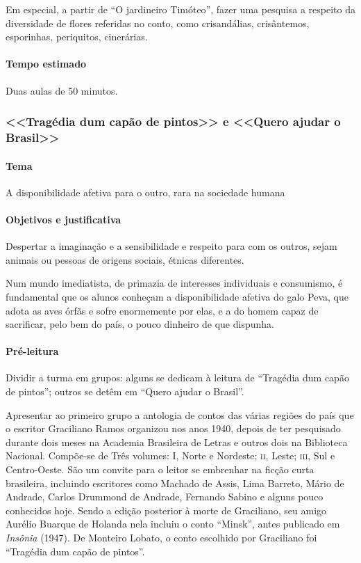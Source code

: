 \documentclass[11pt]{extarticle}
\begin{document}
Em especial, a partir de ``O jardineiro Timóteo'', fazer uma pesquisa a
respeito da diversidade de flores referidas no conto, como crisandálias,
crisântemos, esporinhas, periquitos, cinerárias.

\paragraph{Tempo estimado} Duas aulas de 50 minutos.

\subsubsection{<<Tragédia dum capão de pintos>> e <<Quero ajudar o Brasil>>}

\paragraph{Tema} A disponibilidade afetiva para o outro, rara na sociedade humana

\paragraph{Objetivos e justificativa}
Despertar a imaginação e a sensibilidade e respeito para com os outros,
sejam animais ou pessoas de origens sociais, étnicas diferentes.

Num mundo imediatista, de primazia de interesses individuais e
consumismo, é fundamental que os alunos conheçam a disponibilidade
afetiva do galo Peva, que adota as aves órfãs e sofre enormemente por
elas, e a do homem capaz de sacrificar, pelo bem do país, o pouco
dinheiro de que dispunha.

\asterisc\paragraph{Pré-leitura}

Dividir a turma em grupos: alguns se dedicam à leitura de ``Tragédia dum
capão de pintos''; outros se detêm em ``Quero ajudar o Brasil''.

Apresentar ao primeiro grupo a antologia de contos das várias regiões do
país que o escritor Graciliano Ramos organizou nos anos 1940, depois de
ter pesquisado durante dois meses na Academia Brasileira de Letras e
outros dois na Biblioteca Nacional. Compõe-se de Três volumes: I, Norte
e Nordeste; \textsc{ii}, Leste; \textsc{iii}, Sul e Centro-Oeste. São um convite para o
leitor se embrenhar na ficção curta brasileira, incluindo escritores
como Machado de Assis, Lima Barreto, Mário de Andrade, Carlos Drummond
de Andrade, Fernando Sabino e alguns pouco conhecidos hoje. Sendo a
edição posterior à morte de Graciliano, seu amigo Aurélio Buarque de
Holanda nela incluiu o conto ``Minsk'', antes publicado em
\emph{Insônia} (1947). De Monteiro Lobato, o conto escolhido por
Graciliano foi ``Tragédia dum capão de pintos''.
\end{document}
